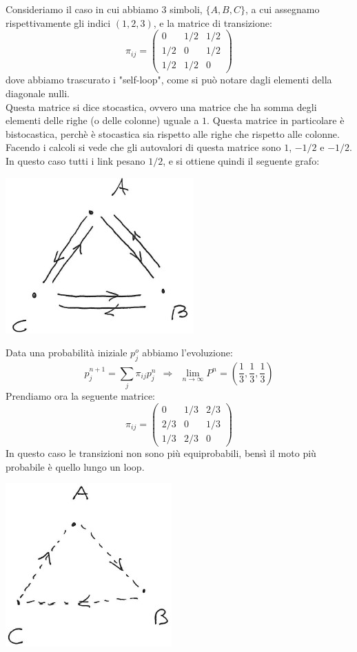 \documentclass[12pt]{article}
\begin{document}
Consideriamo il caso in cui abbiamo 3 simboli, $\{A,B,C\}$, a cui assegnamo rispettivamente gli indici $(1,2,3)$, e la matrice di transizione:
$$
	\pi_{ij} = \begin{pmatrix}
	0 & 1/2 & 1/2 \\
	1/2 & 0 & 1/2 \\
	1/2 & 1/2 & 0
	\end{pmatrix}
$$
dove abbiamo trascurato i "self-loop", come si può notare dagli elementi della diagonale nulli. \\
Questa matrice si dice stocastica, ovvero una matrice che ha somma degli elementi delle righe (o delle colonne) uguale a $1$. Questa matrice in particolare è bistocastica, perchè è stocastica sia rispetto alle righe che rispetto alle colonne. \\
Facendo i calcoli si vede che gli autovalori di questa matrice sono $1$, $-1/2$ e $-1/2$.
In questo caso tutti i link pesano $1/2$, e si ottiene quindi il seguente grafo:
\begin{center}
	\includegraphics[scale=.9]{Grafo equiprobabile}
\end{center}
Data una probabilità iniziale $p_j^o$ abbiamo l'evoluzione:
$$
	p_j^{n+1} = \sum_j \pi_{ij} p_j^n \ \ \Longrightarrow \ \ \lim_{n \rightarrow \infty} P^n = \left(\frac{1}{3},\frac{1}{3},\frac{1}{3}\right)
$$
Prendiamo ora la seguente matrice:
$$
	\pi_{ij} = \begin{pmatrix}
	0 & 1/3 & 2/3 \\
	2/3 & 0 & 1/3 \\
	1/3 & 2/3 & 0
	\end{pmatrix}
$$
In questo caso le transizioni non sono più equiprobabili, bensì il moto più probabile è quello lungo un loop.
\begin{center}
	\includegraphics[scale=1]{Grafo loop}
\end{center}
\end{document}
